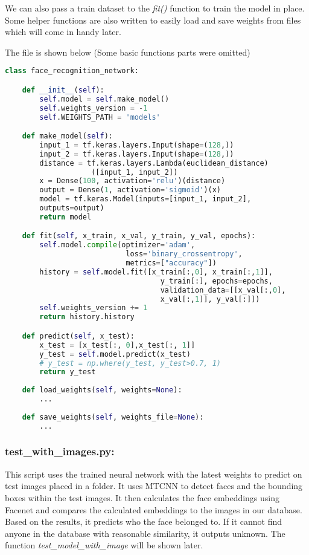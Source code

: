 We can also pass a train dataset to the \textit{fit()} function to train the model in place. Some helper functions are also written to easily load and save weights from files which will come in handy later. 

The file is shown below (Some basic functions parts were omitted)

\begin{center}{\begin{minipage}{0.9\linewidth}
\begin{lstlisting}[language=Python, basicstyle=\fontsize{10}{10}\selectfont\ttfamily]
class face_recognition_network:

    def __init__(self):
        self.model = self.make_model()
        self.weights_version = -1
        self.WEIGHTS_PATH = 'models'

    def make_model(self):
        input_1 = tf.keras.layers.Input(shape=(128,))
        input_2 = tf.keras.layers.Input(shape=(128,))
        distance = tf.keras.layers.Lambda(euclidean_distance)
        			([input_1, input_2])
        x = Dense(100, activation='relu')(distance)
        output = Dense(1, activation='sigmoid')(x)
        model = tf.keras.Model(inputs=[input_1, input_2], 
        outputs=output)
        return model

    def fit(self, x_train, x_val, y_train, y_val, epochs):
        self.model.compile(optimizer='adam', 
        					loss='binary_crossentropy', 
        					metrics=["accuracy"])
        history = self.model.fit([x_train[:,0], x_train[:,1]], 
        							y_train[:], epochs=epochs, 
                                    validation_data=[[x_val[:,0], 
                                    x_val[:,1]], y_val[:]])
        self.weights_version += 1
        return history.history

    def predict(self, x_test):
        x_test = [x_test[:, 0],x_test[:, 1]]
        y_test = self.model.predict(x_test)
        # y_test = np.where(y_test, y_test>0.7, 1)
        return y_test
    
    def load_weights(self, weights=None):
        ...
    
    def save_weights(self, weights_file=None):
        ...
\end{lstlisting}
\end{minipage}}\end{center}

\subsubsection*{test\_with\_images.py:} This script uses the trained neural network with the latest weights to predict on test images placed in a folder. It uses MTCNN to detect faces and the bounding boxes within the test images. It then calculates the face embeddings using Facenet and compares the calculated embeddings to the images in our database. Based on the results, it predicts who the face belonged to. If it cannot find anyone in the database with reasonable similarity, it outputs unknown. The function \textit{test\_model\_with\_image} will be shown later. 

